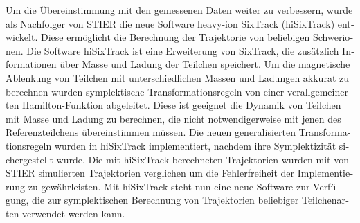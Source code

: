 \begin{otherlanguage}{german}
Um die \"{U}bereinstimmung mit den gemessenen Daten weiter zu verbessern, wurde als Nachfolger von STIER die neue Software heavy-ion SixTrack (hiSixTrack) entwickelt. Diese erm\"{o}glicht die Berechnung der Trajektorie von beliebigen Schwerionen. Die Software hiSixTrack ist eine Erweiterung von SixTrack, die zus\"{a}tzlich Informationen \"{u}ber Masse und Ladung der Teilchen speichert. Um die magnetische Ablenkung von Teilchen mit unterschiedlichen Massen und Ladungen akkurat zu berechnen wurden symplektische Transformationsregeln von einer \mbox{verallgemeinerten} Hamilton-Funktion abgeleitet. Diese ist geeignet die Dynamik von Teilchen mit Masse und Ladung zu berechnen, die nicht notwendigerweise mit jenen des \mbox{Referenzteilchens} \"{u}bereinstimmen m\"{u}ssen. Die neuen generalisierten Transformationsregeln wurden in hiSixTrack implementiert, nachdem ihre Symplektizit\"{a}t sichergestellt wurde. Die mit hiSixTrack berechneten Trajektorien wurden mit von STIER simulierten Trajektorien verglichen um die Fehlerfreiheit der Implementierung zu gew\"{a}hrleisten. Mit hiSixTrack steht nun eine neue Software zur Verf\"{u}gung, die zur symplektischen Berechnung von Trajektorien beliebiger Teilchenarten verwendet werden kann. 
\vspace{0.2cm}



\end{otherlanguage}
